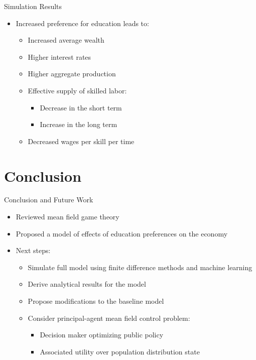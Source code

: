 \documentclass{beamer}
\begin{document}
\begin{frame}{Simulation Results}
\begin{itemize}
    \item Increased preference for education leads to:
    \begin{itemize}
        \item Increased average wealth
        \item Higher interest rates
        \item Higher aggregate production
        \item Effective supply of skilled labor:
        \begin{itemize}
            \item Decrease in the short term
            \item Increase in the long term
        \end{itemize}
        \item Decreased wages per skill per time
    \end{itemize}
\end{itemize}
\end{frame}

\section{Conclusion}

\begin{frame}{Conclusion and Future Work}
\begin{itemize}
    \item Reviewed mean field game theory
    \item Proposed a model of effects of education preferences on the economy
    \item Next steps:
    \begin{itemize}
        \item Simulate full model using finite difference methods and machine learning
        \item Derive analytical results for the model
        \item Propose modifications to the baseline model
        \item Consider principal-agent mean field control problem:
        \begin{itemize}
            \item Decision maker optimizing public policy
            \item Associated utility over population distribution state
        \end{itemize}
    \end{itemize}
\end{itemize}
\end{frame}
\end{document}
